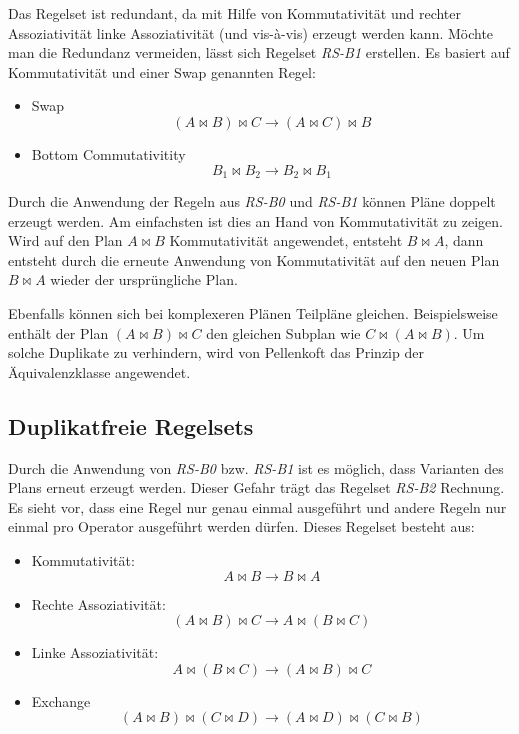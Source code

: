 Das Regelset ist redundant, da mit Hilfe von Kommutativität und rechter Assoziativität linke Assoziativität (und vis-à-vis) erzeugt werden kann. Möchte man die Redundanz vermeiden, lässt sich Regelset \textit{RS-B1} erstellen. Es basiert auf Kommutativität und einer Swap genannten Regel:

\begin{itemize}
\item Swap $$ (A \Join B) \Join C \to (A \Join C) \Join B $$
\item Bottom Commutativitity $$ B_1 \Join B_2 \to B_2 \Join B_1$$
\end{itemize}



Durch die Anwendung der Regeln aus \textit{RS-B0} und \textit{RS-B1} können Pläne doppelt erzeugt werden. Am einfachsten ist dies an Hand von Kommutativität zu zeigen. Wird auf den Plan $A \Join B$ Kommutativität angewendet, entsteht $B \Join A$, dann entsteht durch  die erneute Anwendung von Kommutativität auf den neuen Plan $B \Join A$ wieder der ursprüngliche Plan.

Ebenfalls können sich bei komplexeren Plänen  Teilpläne gleichen. Beispielsweise enthält der Plan $(A \Join B) \Join C$ den gleichen Subplan wie $C \Join (A \Join B)$. Um solche Duplikate zu verhindern, wird von Pellenkoft das Prinzip der Äquivalenzklasse angewendet.



\subsection{Duplikatfreie Regelsets}
Durch die Anwendung von \textit{RS-B0} bzw. \textit{RS-B1} ist es möglich, dass Varianten des Plans erneut erzeugt werden. Dieser Gefahr trägt das Regelset \textit{RS-B2} Rechnung. Es sieht vor, dass eine Regel nur genau einmal ausgeführt und andere Regeln nur einmal pro Operator ausgeführt werden dürfen. Dieses Regelset besteht aus:


\begin{itemize}
\item Kommutativität: $$ A \Join B \to B \Join A$$
\item Rechte Assoziativität: $$(A \Join B) \Join C \to A \Join (B \Join C) $$
\item Linke Assoziativität: $$A \Join (B \Join C) \to (A \Join B) \Join C$$

\item Exchange $$(A \Join B) \Join (C \Join D) \to (A \Join D) \Join (C \Join B) $$
\end{itemize}



